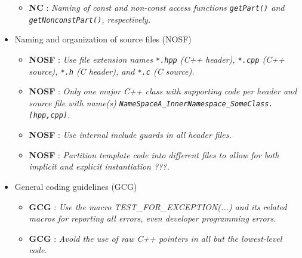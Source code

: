 \begin{itemize}
\begin{itemize}
  {}\item{}\textbf{NC }:
  {}\textit{Naming of const and non-const access functions
  {}\texttt{getPart()} and {}\texttt{getNonconstPart()}, respectively.}

  \end{itemize}

\item Naming and organization of source files (NOSF)

  \setcounter{Thyra_NOSF_counter}{0}

  \begin{itemize}

  {}\item{}\textbf{NOSF
  {}}: {}\textit{Use file extension names
  {}\texttt{*.hpp} (C++ header), {}\texttt{*.cpp} (C++ source), {}\texttt{*.h}
  (C header), and {}\texttt{*.c} (C source).}

  {}\item{}\textbf{NOSF
  {}}: {} {}\textit{Only one major C++ class with
  supporting code per header and source file with name(s)
  {}\texttt{NameSpaceA\-\_InnerNamespace\-\_SomeClass.[hpp,cpp]}.}

  {}\item{}\textbf{NOSF
  {}}: {} {}\textit{Use internal include guards in
  all header files.}

  {}\item{}\textbf{NOSF
  {}}: {} {}\textit{Partition template code into
  different files to allow for both implicit and explicit instantiation ???.}

  \end{itemize}

\item General coding guidelines (GCG)

  \setcounter{Thyra_GCG_counter}{0}

  \begin{itemize}

  {}\item{}\textbf{GCG
  {}}: {}\textit{Use the macro
  TEST\-\_FOR\-\_EXCEPTION(...) and its related macros for reporting all
  errors, even developer programming errors.}

  {}\item{}\textbf{GCG
  {}}: {}\textit{Avoid the use of raw C++ pointers in
  all but the lowest-level code.}


\end{itemize}
\end{itemize}
